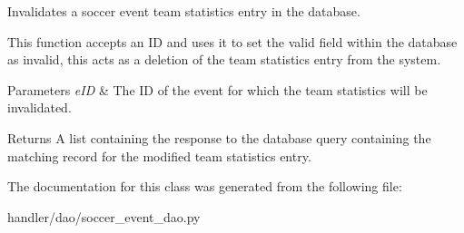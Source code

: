 Invalidates a soccer event team statistics entry in the database. 

This function accepts an ID and uses it to set the valid field within the database as invalid, this acts as a deletion of the team statistics entry from the system.


\begin{DoxyParams}{Parameters}
{\em e\+ID} & The ID of the event for which the team statistics will be invalidated.\\
\hline
\end{DoxyParams}
\begin{DoxyReturn}{Returns}
A list containing the response to the database query containing the matching record for the modified team statistics entry. 
\end{DoxyReturn}


The documentation for this class was generated from the following file\+:\begin{DoxyCompactItemize}
\item 
handler/dao/soccer\+\_\+event\+\_\+dao.\+py\end{DoxyCompactItemize}
